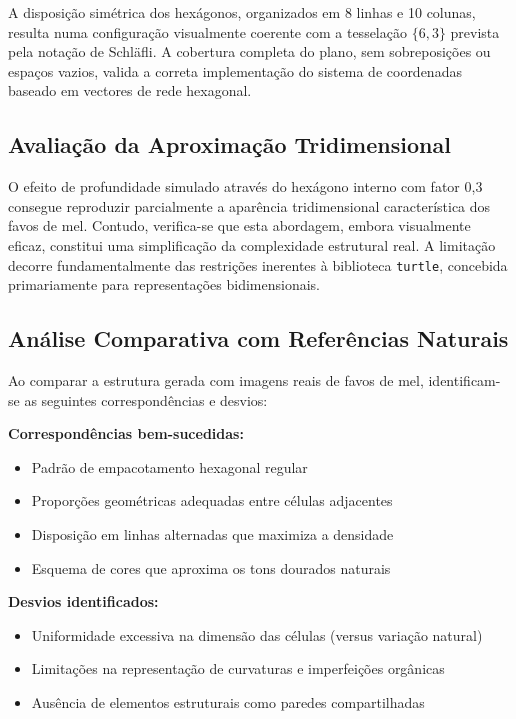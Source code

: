 \documentclass[12pt,a4paper,oneside]{extarticle}
\begin{document}
A disposição simétrica dos hexágonos, organizados em 8 linhas e 10 colunas, resulta numa configuração visualmente coerente com a tesselação $\{6,3\}$ prevista pela notação de Schläfli. A cobertura completa do plano, sem sobreposições ou espaços vazios, valida a correta implementação do sistema de coordenadas baseado em vectores de rede hexagonal.

\subsection{Avaliação da Aproximação Tridimensional}

O efeito de profundidade simulado através do hexágono interno com fator 0,3 consegue reproduzir parcialmente a aparência tridimensional característica dos favos de mel. Contudo, verifica-se que esta abordagem, embora visualmente eficaz, constitui uma simplificação da complexidade estrutural real. A limitação decorre fundamentalmente das restrições inerentes à biblioteca \texttt{turtle}, concebida primariamente para representações bidimensionais.

\subsection{Análise Comparativa com Referências Naturais}

Ao comparar a estrutura gerada com imagens reais de favos de mel, identificam-se as seguintes correspondências e desvios:

\textbf{Correspondências bem-sucedidas:}
\begin{itemize}
    \item Padrão de empacotamento hexagonal regular
    \item Proporções geométricas adequadas entre células adjacentes
    \item Disposição em linhas alternadas que maximiza a densidade
    \item Esquema de cores que aproxima os tons dourados naturais
\end{itemize}

\textbf{Desvios identificados:}
\begin{itemize}
    \item Uniformidade excessiva na dimensão das células (versus variação natural)
    \item Limitações na representação de curvaturas e imperfeições orgânicas
    \item Ausência de elementos estruturais como paredes compartilhadas
\end{itemize}
\end{document}
